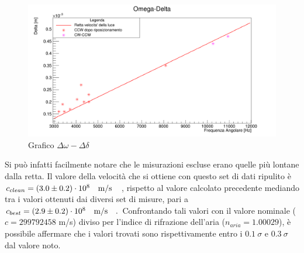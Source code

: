 \documentclass[openright]{article}
\begin{document}
    \begin{figure}[H]
        \centering
        \includegraphics[scale=0.32]{../images/omega_delta.png}
        \caption{Grafico $\Delta\omega-\Delta\delta$}
        \label{Omega-Delta2 dopo il riposizionamento}
    \end{figure}

    Si può infatti facilmente notare che le misurazioni escluse erano quelle più lontane dalla retta. 
    Il valore della velocità che si ottiene con questo set di dati ripulito è 
    $c_{clean} = (3.0 \pm 0.2) \cdot 10^8 \qq {m/s}$, rispetto al valore calcolato precedente mediando tra i valori ottenuti dai diversi set di misure, pari a $c_{best} = (2.9 \pm 0.2)\cdot10^8 \qq {m/s}.$
    Confrontando tali valori con il valore nominale ($ c = 299 792 458$ m/s) diviso per l'indice di rifrazione dell'aria ($ n_{aria} = 1.00029$), è possibile affermare che i valori trovati sono rispettivamente entro i $0.1~\sigma$ e  $0.3~\sigma$ dal valore noto.
\end{document}
